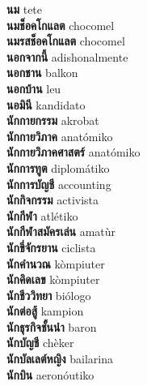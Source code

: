 \textbf{ นม  } tete \\
\textbf{ นมช็อคโกแลต  } chocomel \\
\textbf{ นมรสช็อคโกแลต  } chocomel \\
\textbf{ นอกจากนี้  } adishonalmente \\
\textbf{ นอกชาน  } balkon \\
\textbf{ นอกบ้าน  } leu \\
\textbf{ นอมินี  } kandidato \\
\textbf{ นักกายกรรม  } akrobat \\
\textbf{ นักกายวิภาค  } anatómiko \\
\textbf{ นักกายวิภาคศาสตร์  } anatómiko \\
\textbf{ นักการทูต  } diplomátiko \\
\textbf{ นักการบัญชี  } accounting \\
\textbf{ นักกิจกรรม  } activista \\
\textbf{ นักกีฬา  } atlétiko \\
\textbf{ นักกีฬาสมัครเล่น  } amatùr \\
\textbf{ นักขี่จักรยาน  } ciclista \\
\textbf{ นักคำนวณ  } kòmpiuter \\
\textbf{ นักคิดเลข  } kòmpiuter \\
\textbf{ นักชีววิทยา  } biólogo \\
\textbf{ นักต่อสู้  } kampion \\
\textbf{ นักธุรกิจชั้นนำ  } baron \\
\textbf{ นักบัญชี  } chèker \\
\textbf{ นักบัลเลต์หญิง  } bailarina \\
\textbf{ นักบิน  } aeronóutiko \\
